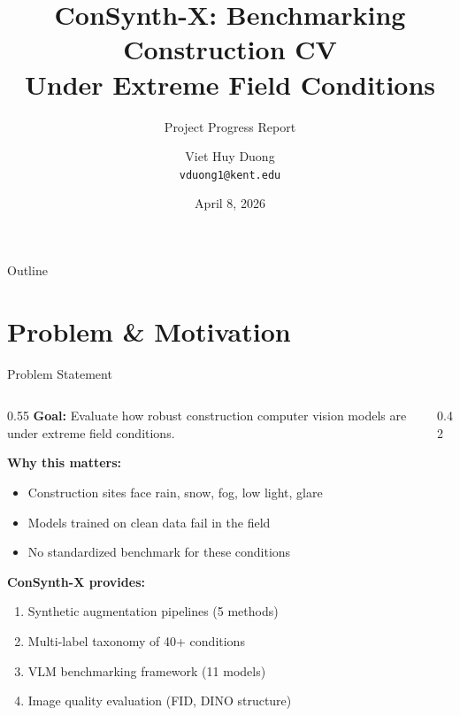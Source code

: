 \documentclass[aspectratio=169, 10pt]{beamer}
\title[ConSynth-X]{ConSynth-X: Benchmarking Construction CV\\Under Extreme Field Conditions}
\subtitle{Project Progress Report}
\author{Viet Huy Duong \\ \texttt{vduong1@kent.edu}}
\institute{Kent State University}
\date{April 8, 2026}
\begin{document}
\begin{frame}
\titlepage
\end{frame}

\begin{frame}{Outline}
\tableofcontents
\end{frame}

\section{Problem \& Motivation}

\begin{frame}{Problem Statement}
\begin{columns}[T]
\begin{column}{0.55\textwidth}
\textbf{Goal:} Evaluate how robust construction computer vision models are under extreme field conditions.

\vspace{0.5em}
\textbf{Why this matters:}
\begin{itemize}
    \item Construction sites face rain, snow, fog, low light, glare
    \item Models trained on clean data fail in the field
    \item No standardized benchmark for these conditions
\end{itemize}

\vspace{0.5em}
\textbf{ConSynth-X provides:}
\begin{enumerate}
    \item Synthetic augmentation pipelines (5 methods)
    \item Multi-label taxonomy of 40+ conditions
    \item VLM benchmarking framework (11 models)
    \item Image quality evaluation (FID, DINO structure)
\end{enumerate}
\end{column}
\begin{column}{0.42\textwidth}
\centering
{}
\end{column}
\end{columns}
\end{frame}
\end{document}
